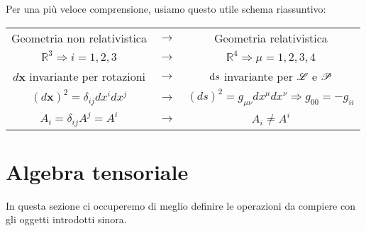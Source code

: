 \begin{osservazione}
Per una pi\`u veloce comprensione, usiamo questo utile schema
riassuntivo:
\begin{table}[htb]
\begin{center}
\begin{tabular}{ccc}
Geometria non relativistica &$\longrightarrow$& Geometria relativistica\\
$\mathbb{R}^3\Longrightarrow i=1,2,3$ & $\longrightarrow$ & 
$\mathbb{R}^4\Longrightarrow\mu=1,2,3,4$\\
$d\mathbf{x}$ invariante per rotazioni & $\longrightarrow$ & 
$\mathrm{d} s$ invariante per $\mathscr{L}$ e $\mathscr{P}$\\
$(d\mathbf{x})^2=\delta_{ij}dx^idx^j$ & $\longrightarrow$ & 
$(ds)^2=g_{\mu\nu}dx^{\mu}dx^{\nu} \Longrightarrow 
g_{0\mbox{}0}=-g_{i\mbox{}i}$\\
$A_i=\delta_{ij}A^{j}=A^i$ & $\longrightarrow$ & $A_i\neq A^i$
\end{tabular}
\end{center}
\end{table}
\end{osservazione}
\section{ Algebra tensoriale}
In questa sezione ci occuperemo di meglio
definire le operazioni da compiere con gli oggetti introdotti sinora.
